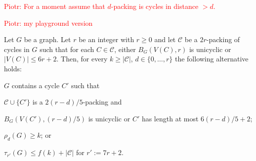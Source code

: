\documentclass{patmorin}
\newcommand{\pat}[1]{\textcolor{Blue}{Pat: #1}}
\newcommand{\piotr}[1]{\textcolor{red}{Piotr: #1}}
\DeclareMathOperator{\dist}{dist}
\begin{document}








\piotr{For a moment assume that $d$-packing is cycles in distance $>d$.}

\piotr{my playground version}
\begin{lem}\label{a_or_b2}
  Let $G$ be a graph. 
  Let $r$ be an integer with $r\geq0$ and 
  let $\mathcal{C}$ be a $2r$-packing of cycles in $G$ such that 
  for each $C\in\mathcal{C}$, 
  either  $B_G(V(C),r)$ is unicyclic 
  or $|V(C)|\le 6r+2$. 
  Then, for every $k\ge |\mathcal{C}|$, $d\in\{0,\ldots,r\}$ 
  the following alternative holds:
  \begin{compactenum}[(a)]
    \item $G$ contains a cycle $C'$ such that
    \begin{compactenum}[(i)]
      \item $\mathcal{C}\cup\{C'\}$ is a $2(r-d)/5$-packing and
      \item $B_G(V(C'),(r-d)/5)$ is unicyclic or $C'$ has length at most $6(r-d)/5+2$;
    \end{compactenum}
    \item $\rho_d(G)\ge k$; or
    \item $\tau_{r'}(G) \le f(k)+ |\mathcal{C}|$ for $r':=7r+2$.
  \end{compactenum}
\end{lem}
\end{document}

